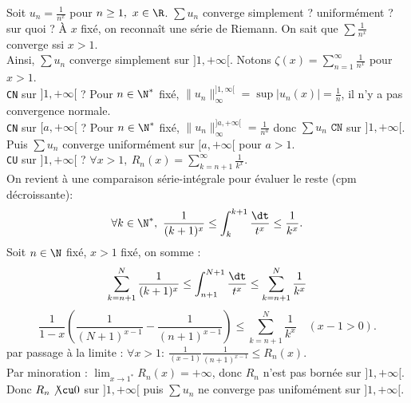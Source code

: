 \documentclass[11pt]{article}
\begin{document}
\begin{ex}{}{}
    Soit $u_n=\frac{1}{n^x}$ pour $n\geq1, ~ x\in\R$. $\sum u_n$ converge simplement ? uniformément ? sur quoi ?
    \tcblower
    À $x$ fixé, on reconnaît une série de Riemann. On sait que $\sum\frac{1}{n^x}$ converge ssi $x>1$.\\
    Ainsi, $\sum u_n$ converge simplement sur $]1,+\infty[$. Notons $\zeta(x)=\sum_{n=1}^\infty\frac{1}{n^x}$ pour $x>1$.\\
    \texttt{CN} sur $]1,+\infty[$ ? Pour $n\in\N^*$ fixé, $\|u_n\|_\infty^{]1,\infty[}=\sup|u_n(x)|=\frac{1}{n}$, il n'y a pas convergence normale.\\
    \texttt{CN} sur $[a,+\infty[$ ? Pour $n\in\N^*$ fixé, $\|u_n\|_\infty^{]a,+\infty[}=\frac{1}{n^a}$ donc $\sum u_n$ $\texttt{CN}$ sur $]1,+\infty[$.\\
    Puis $\sum u_n$ converge uniformément sur $[a,+\infty[$ pour $a>1$.\\
    \texttt{CU} sur $]1,+\infty[$ ? $\forall x > 1, ~ R_n(x)=\sum_{k=n+1}^{\infty}\frac{1}{k^x}$.\\
    On revient à une comparaison série-intégrale pour évaluer le reste (cpm décroissante):
    \begin{equation*}
        \forall k \in \N^*, ~ \frac{1}{(k+1)^x} \leq \int_k^{k+1}\frac{\dt}{t^x} \leq \frac{1}{k^x}.
    \end{equation*}
    Soit $n\in\N$ fixé, $x>1$ fixé, on somme :
    \begin{equation*}
        \sum_{k=n+1}^N\frac{1}{(k+1)^x}\leq\int_{n+1}^{N+1}\frac{\dt}{t^x}\leq\sum_{k=n+1}^N\frac{1}{k^x}
    \end{equation*}
    \begin{equation*}
        \frac{1}{1-x}\left( \frac{1}{(N+1)^{x-1}} - \frac{1}{(n+1)^{x-1}} \right) \leq \sum_{k=n+1}^N\frac{1}{k^x} \quad (x-1>0).
    \end{equation*}
    par passage à la limite : $\forall x > 1 : ~ \frac{1}{(x-1)}\frac{1}{(n+1)^{x-1}}\leq R_n(x)$.\\
    Par minoration : $\lim_{x\to1^*}R_n(x)=+\infty$, donc $R_n$ n'est pas bornée sur $]1,+\infty[$.\\
    Donc $R_n\not\cu0$ sur $]1,+\infty[$ puis $\sum u_n$ ne converge pas unifomément sur $]1,+\infty[$.
\end{ex}

\vspace*{-0.4cm}
\end{document}
